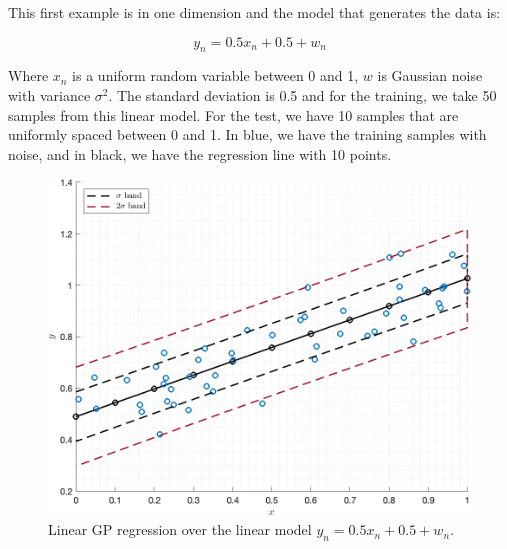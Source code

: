 \documentclass[11pt]{article}
\begin{document}
\begin{tcolorbox}[colback=CrispBlue!5!white,colframe=CrispBlue!75!black,title=Gaussian Process.]
    This first example is in one dimension and the model that generates the data is:
    
    \begin{equation}
        y_n = 0.5x_n + 0.5 + w_n
    \end{equation}
    
    Where \(x_n\) is a uniform random variable between 0 and 1, \(w\) is Gaussian noise with variance \(\sigma^2\). The standard deviation is 0.5 and for the training, we take 50 samples from this linear model. For the test, we have 10 samples that are uniformly spaced between 0 and 1. In blue, we have the training samples with noise, and in black, we have the regression line with 10 points.

\end{tcolorbox}

\begin{figure}[h!]
    \centering
    \includegraphics[width=\textwidth]{figure01.png}
    \caption{Linear GP regression over the linear model \( y_n = 0.5x_n + 0.5 + w_n\).}
    \label{fig:fig01}
\end{figure}
\end{document}
